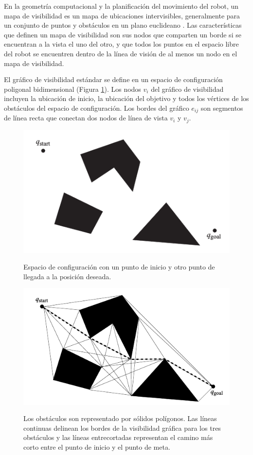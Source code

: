 En la geometr\'ia computacional y la planificaci\'on del movimiento del 
robot, un mapa de visibilidad es un mapa de ubicaciones intervisibles, 
generalmente para un conjunto de puntos y obst\'aculos en un plano 
euclideano \cite{wikiVisibilityGraph}. Las caracter\'isticas que definen 
un mapa de visibilidad son sus nodos que comparten un borde si se encuentran 
a la vista el uno del otro, y que todos los puntos en el espacio libre del 
robot se encuentren dentro de la l\'inea de visi\'on de al menos un nodo 
en el mapa de visibilidad. 

El gr\'afico de visibilidad est\'andar se define en un espacio de 
configuraci\'on poligonal bidimensional (Figura \ref{f:mapPolygonal}). Los 
nodos $v_{i}$ del gr\'afico de visibilidad incluyen la ubicaci\'on de 
inicio, la ubicaci\'on del objetivo y todos los v\'ertices de los obst\'aculos 
del espacio de configuraci\'on. Los bordes del gr\'afico $e_{ij}$ son 
segmentos de l\'inea recta que conectan dos nodos de l\'inea de vista $v_{i}$ 
y $v_{j}$.

\begin{figure}%
\centering \footnotesize
 {\includegraphics[width=0.60\linewidth]{images/map_polygonal.png}}
 \captionsetup{font=footnotesize}
 \caption{Espacio de configuraci\'on con un punto de inicio y otro punto 
 de llegada a la posici\'on deseada.}
\label{f:mapPolygonal}
\end{figure}

\begin{figure}%
\centering \footnotesize
 {\includegraphics[width=0.60\linewidth]{images/shortPath_visibilityGraph.png}}
 \captionsetup{font=footnotesize}
 \caption{Los obst\'aculos son representado por s\'olidos pol\'igonos. Las 
 l\'ineas continuas delinean los bordes de la visibilidad gr\'afica para 
 los tres obst\'aculos y las l\'ineas entrecortadas representan el camino 
 m\'as corto entre el punto de inicio y el punto de meta.}
\label{f:shortVG}
\end{figure}

